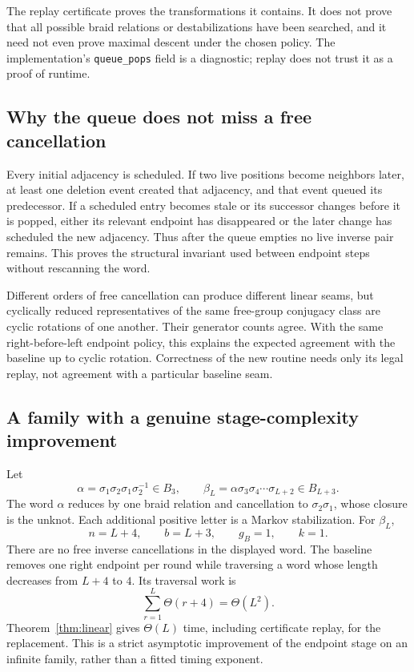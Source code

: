 \documentclass[11pt,letterpaper]{article}
\theoremstyle{definition}
\begin{document}
The replay certificate proves the transformations it contains. It does not prove that all possible braid relations or destabilizations have been searched, and it need not even prove maximal descent under the chosen policy. The implementation's \texttt{queue\_pops} field is a diagnostic; replay does not trust it as a proof of runtime.

\subsection{Why the queue does not miss a free cancellation}
Every initial adjacency is scheduled. If two live positions become neighbors later, at least one deletion event created that adjacency, and that event queued its predecessor. If a scheduled entry becomes stale or its successor changes before it is popped, either its relevant endpoint has disappeared or the later change has scheduled the new adjacency. Thus after the queue empties no live inverse pair remains. This proves the structural invariant used between endpoint steps without rescanning the word.

Different orders of free cancellation can produce different linear seams, but cyclically reduced representatives of the same free-group conjugacy class are cyclic rotations of one another. Their generator counts agree. With the same right-before-left endpoint policy, this explains the expected agreement with the baseline up to cyclic rotation. Correctness of the new routine needs only its legal replay, not agreement with a particular baseline seam.

\subsection{A family with a genuine stage-complexity improvement}
\label{subsec:stabilized}
Let
\begin{equation}
 \alpha=\sigma_1\sigma_2\sigma_1\sigma_2^{-1}\in B_3,
 \qquad
 \beta_L=\alpha\sigma_3\sigma_4\cdots\sigma_{L+2}\in B_{L+3}.
 \label{eq:stabilized}
\end{equation}
The word $\alpha$ reduces by one braid relation and cancellation to $\sigma_2\sigma_1$, whose closure is the unknot. Each additional positive letter is a Markov stabilization. For $\beta_L$,
\[
 n=L+4,\qquad b=L+3,\qquad g_B=1,\qquad k=1.
\]
There are no free inverse cancellations in the displayed word. The baseline removes one right endpoint per round while traversing a word whose length decreases from $L+4$ to $4$. Its traversal work is
\[
 \sum_{r=1}^{L}\Theta(r+4)=\Theta(L^2).
\]
Theorem~\ref{thm:linear} gives $\Theta(L)$ time, including certificate replay, for the replacement. This is a strict asymptotic improvement of the endpoint stage on an infinite family, rather than a fitted timing exponent.
\end{document}
